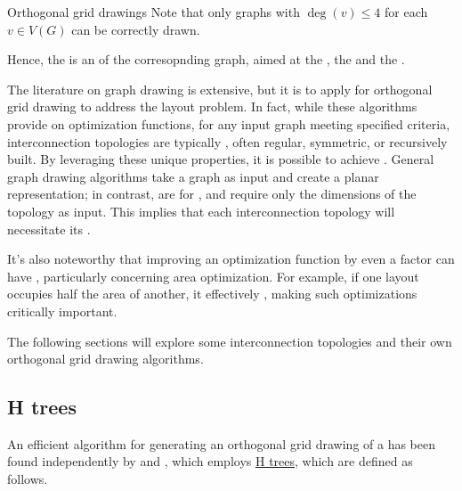 \documentclass[a4paper, 12pt]{report}
\begin{document}
    \begin{framedobs}{Orthogonal grid drawings}
        Note that only graphs with $\deg(v) \le 4$ for each $v \in V(G)$ can be correctly drawn.
    \end{framedobs}

    Hence, the  is an  of the corresopnding graph, aimed at  the , the  and the .

    The literature on graph drawing is extensive, but it is  to apply  for orthogonal grid drawing to address the layout problem. In fact, while these algorithms provide  on optimization functions, for any input graph meeting specified criteria, interconnection topologies are typically , often regular, symmetric, or recursively built. By leveraging these unique properties, it is possible to achieve . General graph drawing algorithms take a graph as input and create a planar representation; in contrast,  are  for , and require only the dimensions of the topology as input. This implies that each interconnection topology will necessitate its .

    It's also noteworthy that improving an optimization function by even a  factor can have , particularly concerning area optimization. For example, if one layout occupies half the area of another, it effectively , making such optimizations critically important.

    The following sections will explore some interconnection topologies and their own orthogonal grid drawing algorithms.

    \subsection{H trees}

    An efficient algorithm for generating an orthogonal grid drawing of a  has been found independently by \textcite{leiserson} and \textcite{valiant}, which employs \href{https://en.wikipedia.org/wiki/H_tree}{H trees}, which are defined as follows.
\end{document}

